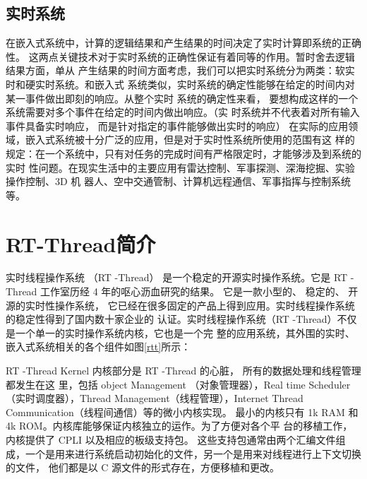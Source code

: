\subsection{实时系统}
在嵌入式系统中，计算的逻辑结果和产生结果的时间决定了实时计算即系统的正确性。
这两点关键技术对于实时系统的正确性保证有着同等的作用。暂时舍去逻辑结果方面，单从
产生结果的时间方面考虑，我们可以把实时系统分为两类：软实时和硬实时系统。和嵌入式
系统类似，实时系统的确定性能够在给定的时间内对某一事件做出即刻的响应。从整个实时
系统的确定性来看， 要想构成这样的一个系统需要对多个事件在给定的时间内做出响应。（实
时系统并不代表着对所有输入事件具备实时响应， 而是针对指定的事件能够做出实时的响应）
在实际的应用领域，嵌入式系统被十分广泛的应用，但是对于实时性系统所使用的范围有这
样的规定：在一个系统中，只有对任务的完成时间有严格限定时，才能够涉及到系统的实时
性问题。在现实生活中的主要应用有雷达控制、军事探测、深海挖掘、实验操作控制、3D 机
器人、空中交通管制、计算机远程通信、军事指挥与控制系统等。

\section{RT-Thread简介}
实时线程操作系统 （RT -Thread）
是一个稳定的开源实时操作系统。它是 RT -Thread
工作室历经 4 年的呕心沥血研究的结果。 它是一款小型的、 稳定的、 开源的实时性操作系统，
它已经在很多固定的产品上得到应用。实时线程操作系统的稳定性得到了国内数十家企业的
认证。实时线程操作系统（RT -Thread）不仅是一个单一的实时操作系统内核，它也是一个完
整的应用系统，其外围的实时、嵌入式系统相关的各个组件如图\ref{rtt}所示：

RT -Thread Kernel 内核部分是 RT -Thread 的心脏， 所有的数据处理和线程管理都发生在这
里，包括 object  Management （对象管理器），Real  time  Scheduler（实时调度器），Thread
Management（线程管理），Internet Thread Communication（线程间通信）等的微小内核实现。
最小的内核只有 1k  RAM 和 4k  ROM。内核库能够保证内核独立的运作。为了方便对各个平
台的移植工作， 内核提供了 CPLI 以及相应的板级支持包。 这些支持包通常由两个汇编文件组
成，一个是用来进行系统启动初始化的文件，另一个是用来对线程进行上下文切换的文件，
他们都是以 C 源文件的形式存在，方便移植和更改。















